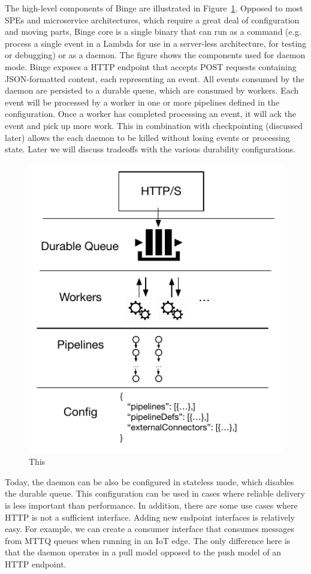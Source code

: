 \documentclass[10pt,twocolumn]{article}
\begin{document}
The high-level components of Binge are illustrated in
Figure~\ref{fig:binge-daemon}.  Opposed to most SPEs and microservice
architectures, which require a great deal of configuration and moving parts,
Binge core is a single binary that can run as a command (e.g.  process a single
event in a Lambda for use in a server-less architecture, for testing or
debugging) or as a daemon.  The figure shows the components used for daemon
mode.  Binge exposes a HTTP endpoint that accepts POST requests containing
JSON-formatted content, each representing an event.  All events consumed by the
daemon are persisted to a durable queue, which are consumed by workers.  Each
event will be processed by a worker in one or more pipelines defined in the
configuration.  Once a worker has completed processing an event, it will ack
the event and pick up more work.  This in combination with checkpointing
(discussed later) allows the each daemon to be killed without losing events or
processing state.  Later we will discuss tradeoffs with the various durability
configurations. 

\begin{figure}[h]
\centering
\includegraphics[scale=0.60]{figures/binge-daemon.pdf}
\caption{This}
\label{fig:binge-daemon}
\end{figure}

Today, the daemon can be also be configured in stateless mode, which disables
the durable queue.  This configuration can be used in cases where reliable
delivery is less important than performance.  In addition, there are some use
cases where HTTP is not a sufficient interface.  Adding new endpoint interfaces
is relatively easy.  For example, we can create a consumer interface that
consumes messages from MTTQ queues when running in an IoT edge.  The only
difference here is that the daemon operates in a pull model opposed to the push
model of an HTTP endpoint.
\end{document}
